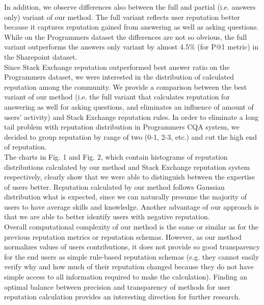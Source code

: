 \documentclass{llncs}
\begin{document}
			In addition, we observe differences also between the full and partial (i.e.
			answers only) variant of our method. The full variant reflects user reputation
			better because it captures reputation gained from answering as well as asking
			questions. While on the Programmers dataset the differences are not so obvious,
			the full variant outperforms the answers only variant by almost 4.5\% (for P@1
			metric) in the Sharepoint dataset.	\\
			Since Stack Exchange reputation outperformed best answer ratio on the Programmers
			dataset, we were interested in the distribution of calculated reputation
			among the community. We provide a comparison between the best variant of our
			method (i.e. the full variant that calculates reputation for answering as well for
			asking questions, and eliminates an influence of amount of users’ activity) and
			Stack Exchange reputation rules. In order to eliminate a long tail problem with
			reputation distribution in Programmers CQA system, we decided to group reputation
			by range of two (0-1, 2-3, etc.) and cut the high end of reputation.	\\
			The charts in Fig. 1 and Fig. 2, which contain histograms of reputation
			distributions calculated by our method and Stack Exchange reputation system
			respectively, clearly show that we were able to distinguish between the expertise
			of users better. Reputation calculated by our method follows Gaussian distribution
			what is expected, since we can naturally presume the majority of users to
			have average skills and knowledge. Another advantage of our approach is that
			we are able to better identify users with negative reputation.	\\
			
			Overall computational complexity of our method is the same or similar as for
			the previous reputation metrics or reputation schemas. However, as our method
			normalizes values of users contributions, it does not provide so good transparency
			for the end users as simple rule-based reputation schemas (e.g. they cannot
			easily verify why and how much of their reputation changed because they do
			not have simple access to all information required to make the calculation).
			Finding an optimal balance between precision and transparency of methods for
			user reputation calculation provides an interesting direction for further research.
\end{document}
